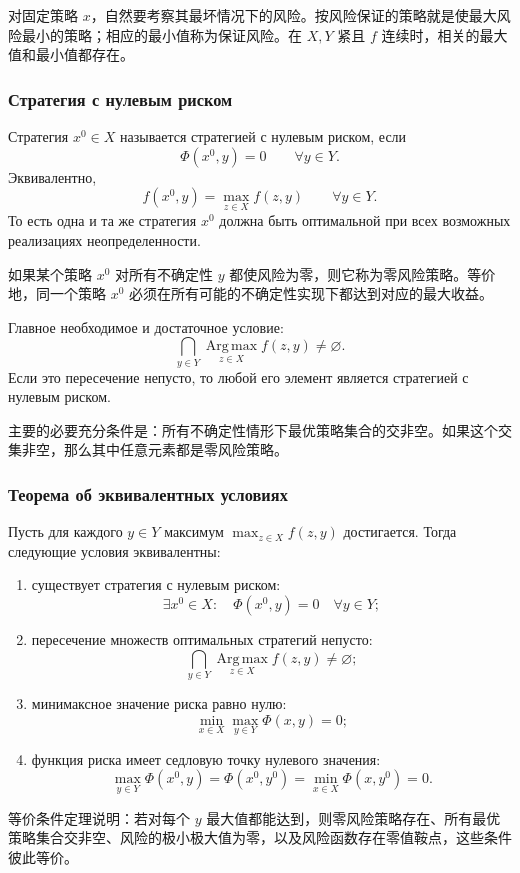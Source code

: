 \documentclass[12pt,a4paper]{article}
\newcommand{\Argmax}{\operatorname*{Arg\,max}}
\newcommand{\zh}[1]{\par\noindent #1\par}
\begin{document}
\zh{对固定策略 $x$，自然要考察其最坏情况下的风险。按风险保证的策略就是使最大风险最小的策略；相应的最小值称为保证风险。在 $X,Y$ 紧且 $f$ 连续时，相关的最大值和最小值都存在。}

\subsubsection{Стратегия с нулевым риском}
Стратегия $x^0\in X$ называется стратегией с нулевым риском, если
\[
\Phi(x^0,y)=0\qquad \forall y\in Y.
\]
Эквивалентно,
\[
f(x^0,y)=\max_{z\in X}f(z,y)\qquad \forall y\in Y.
\]
То есть одна и та же стратегия $x^0$ должна быть оптимальной при всех возможных реализациях неопределенности.

\zh{如果某个策略 $x^0$ 对所有不确定性 $y$ 都使风险为零，则它称为零风险策略。等价地，同一个策略 $x^0$ 必须在所有可能的不确定性实现下都达到对应的最大收益。}

Главное необходимое и достаточное условие:
\[
\bigcap_{y\in Y}\Argmax_{z\in X} f(z,y)\ne\varnothing.
\]
Если это пересечение непусто, то любой его элемент является стратегией с нулевым риском.

\zh{主要的必要充分条件是：所有不确定性情形下最优策略集合的交非空。如果这个交集非空，那么其中任意元素都是零风险策略。}


\subsubsection{Теорема об эквивалентных условиях}
Пусть для каждого $y\in Y$ максимум $\max_{z\in X}f(z,y)$ достигается. Тогда следующие условия эквивалентны:
\begin{enumerate}
  \item существует стратегия с нулевым риском:
  \[
  \exists x^0\in X:\quad \Phi(x^0,y)=0\quad \forall y\in Y;
  \]
  \item пересечение множеств оптимальных стратегий непусто:
  \[
  \bigcap_{y\in Y}\Argmax_{z\in X} f(z,y)\ne\varnothing;
  \]
  \item минимаксное значение риска равно нулю:
  \[
  \min_{x\in X}\max_{y\in Y}\Phi(x,y)=0;
  \]
  \item функция риска имеет седловую точку нулевого значения:
  \[
  \max_{y\in Y}\Phi(x^0,y)=\Phi(x^0,y^0)=\min_{x\in X}\Phi(x,y^0)=0.
  \]
\end{enumerate}

\zh{等价条件定理说明：若对每个 $y$ 最大值都能达到，则零风险策略存在、所有最优策略集合交非空、风险的极小极大值为零，以及风险函数存在零值鞍点，这些条件彼此等价。}
\end{document}
